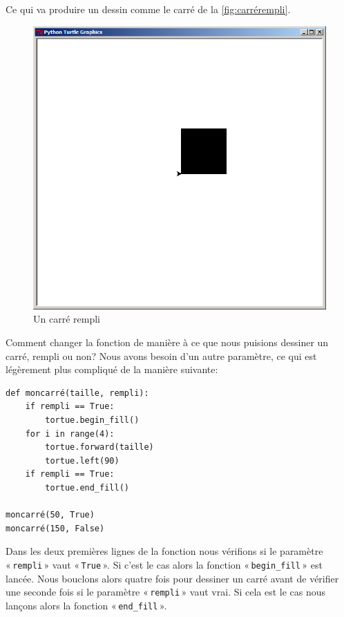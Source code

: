 Ce qui va produire un dessin comme le carré de la \autoref{fig:carrérempli}.
\begin{figure}[H]
\centering
\includegraphics[scale=0.4]{images/carrerempli}
\caption{Un carré rempli}\label{fig:carrérempli}
\end{figure}

Comment changer la fonction de manière à ce que nous puisions dessiner un carré, rempli ou non? Nous avons besoin d'un autre paramètre, ce qui est légèrement plus compliqué de la manière suivante:

\begin{Verbatim}[frame=single,rulecolor=\color{mbleu}, label=à taper]
def moncarré(taille, rempli):
    if rempli == True:
        tortue.begin_fill()
    for i in range(4):
        tortue.forward(taille)
        tortue.left(90)
    if rempli == True:
        tortue.end_fill()
        
moncarré(50, True)
moncarré(150, False)
\end{Verbatim}

Dans les deux premières lignes de la fonction nous vérifions si le paramètre « \texttt{rempli} » vaut « \texttt{True} ». Si c'est le cas alors la fonction « \texttt{begin\_fill} »  est lancée. Nous bouclons alors quatre fois pour dessiner un carré avant de vérifier une seconde fois si le paramètre « \texttt{rempli} » vaut vrai.
Si cela est le cas nous lançons alors la fonction « \texttt{end\_fill} ».

